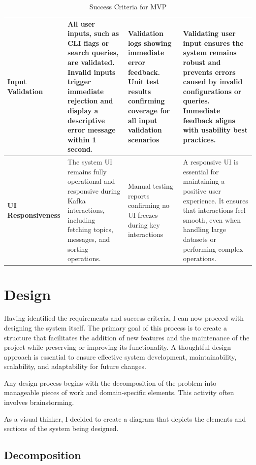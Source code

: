 \documentclass[10pt , a4paper]{report}
\begin{document}
\begin{table}[h!tbp]
\begin{adjustbox}{max width=\textwidth}
\begin{tabular}{|p{3.5cm}|p{6.5cm}|p{4.5cm}|p{4cm}|}
\textbf{Input Validation} & 
All user inputs, such as CLI flags or search queries, are validated. Invalid inputs trigger immediate rejection and display a descriptive error message within 1 second. & 
Validation logs showing immediate error feedback. Unit test results confirming coverage for all input validation scenarios & 
Validating user input ensures the system remains robust and prevents errors caused by invalid configurations or queries. Immediate feedback aligns with usability best practices. \\ \hline

\textbf{UI Responsiveness} & 
The system UI remains fully operational and responsive during Kafka interactions, including fetching topics, messages, and sorting operations. & 
Manual testing reports confirming no UI freezes during key interactions & 
A responsive UI is essential for maintaining a positive user experience. It ensures that interactions feel smooth, even when handling large datasets or performing complex operations. \\ \hline

\end{tabular}
\end{adjustbox}
\caption{Success Criteria for MVP}
\label{tab:success-criteria-mvp}
\end{table}


\chapter{Design}

Having identified the requirements and success criteria, I can now proceed with designing the system itself. The primary goal of this process is to create a structure that facilitates the addition of new features and the maintenance of the project while preserving or improving its functionality. A thoughtful design approach is essential to ensure effective system development, maintainability, scalability, and adaptability for future changes.

Any design process begins with the decomposition of the problem into manageable pieces of work and domain-specific elements. This activity often involves brainstorming.

As a visual thinker, I decided to create a diagram that depicts the elements and sections of the system being designed.

\section{Decomposition}
\end{document}
